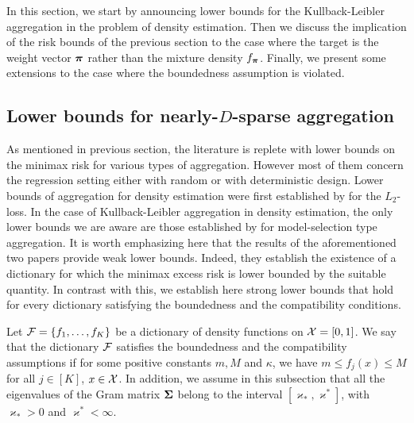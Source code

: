 In this section, we start by announcing lower bounds for the Kullback-Leibler aggregation
in the problem of density estimation. Then we discuss the implication of the risk bounds of the
previous section to the case where the target is the weight vector $\boldsymbol \pi$ rather than the
mixture density $f_{\boldsymbol \pi}$. Finally, we present some extensions to the case where the boundedness
assumption is violated.

\subsection{Lower bounds for nearly-$D$-sparse aggregation}
\label{ssec:lower}

As mentioned in previous section, the literature is replete with lower bounds on the minimax
risk for various types of aggregation. However most of them concern the regression setting either
with random or with deterministic design. Lower bounds of aggregation for density estimation were
first established by \cite{rigollet:these} for the $L_2$-loss. In the case of Kullback-Leibler
aggregation in density estimation, the only lower bounds we are aware are those established
by \cite{Lecue06} for model-selection type aggregation. It is worth emphasizing here that the
results of the aforementioned two papers provide weak lower bounds. Indeed, they establish
the existence of a dictionary for which the minimax excess risk is lower bounded by the
suitable quantity. In contrast with this, we establish here strong lower bounds that hold
for every dictionary satisfying the boundedness and the compatibility conditions.

Let $\mathcal F = \{f_1,\ldots,f_K\}$ be a dictionary of density functions on $\mathcal X =[0,1]$.
We say that the dictionary $\mathcal F$ satisfies the boundedness and the compatibility assumptions
if for some positive constants $m,M$ and $\kappa$, we have $m \le f_j(x)\le M $ for all
$j\in[K]$, $x\in\mathcal X$. In addition,  we assume in this subsection that all the eigenvalues 
of the Gram matrix $\boldsymbol\Sigma$ belong to the interval $[\varkappa_*,\varkappa^*]$, with 
$\varkappa_*>0$ and $\varkappa^*<\infty$. 


